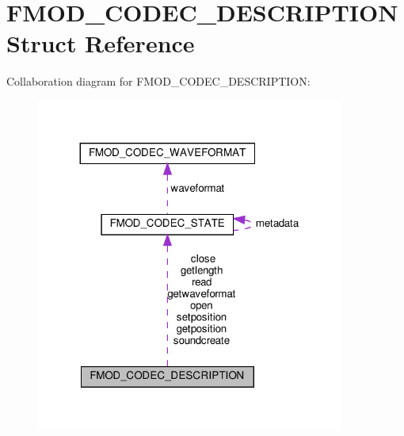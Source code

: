 \hypertarget{structFMOD__CODEC__DESCRIPTION}{}\section{F\+M\+O\+D\+\_\+\+C\+O\+D\+E\+C\+\_\+\+D\+E\+S\+C\+R\+I\+P\+T\+I\+ON Struct Reference}
\label{structFMOD__CODEC__DESCRIPTION}


Collaboration diagram for F\+M\+O\+D\+\_\+\+C\+O\+D\+E\+C\+\_\+\+D\+E\+S\+C\+R\+I\+P\+T\+I\+ON\+:
\nopagebreak
\begin{figure}[H]
\begin{center}
\leavevmode
\includegraphics[width=287pt]{structFMOD__CODEC__DESCRIPTION__coll__graph}
\end{center}
\end{figure}
